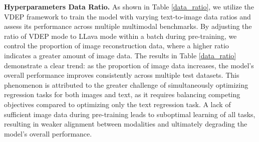 \textbf{Hyperparameters Data Ratio.} As shown in Table \ref{data_ratio}, we utilize the VDEP framework to train the model with varying text-to-image data ratios and assess its performance across multiple multimodal benchmarks. By adjusting the ratio of VDEP mode to LLava mode within a batch during pre-training, we control the proportion of image reconstruction data, where a higher ratio indicates a greater amount of image data.
The results in Table \ref{data_ratio} demonstrate a clear trend: as the proportion of image data increases, the model's overall performance improves consistently across multiple test datasets. This phenomenon is attributed to the greater challenge of simultaneously optimizing regression tasks for both images and text, as it requires balancing competing objectives compared to optimizing only the text regression task. A lack of sufficient image data during pre-training leads to suboptimal learning of all tasks, resulting in weaker alignment between modalities and ultimately degrading the model’s overall performance.



